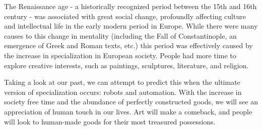 The Renaissance age - a historically recognized period between the 15th and 16th century - was associated with great social change, profoundly affecting culture and intellectual life in the early modern period in Europe. While there were many causes to this change in mentality (including the Fall of Constantinople, an emergence of Greek and Roman texts, etc.) this period was effectively caused by the increase in specialization in European society. People had more time to explore creative interests, such as paintings, sculptures, literature, and religion.

Taking a look at our past, we can attempt to predict this when the ultimate version of specialization occurs: robots and automation. With the increase in society free time and the abundance of perfectly constructed goods, we will see an appreciation of human touch in our lives. Art will make a comeback, and people will look to human-made goods for their most treasured possessions.   